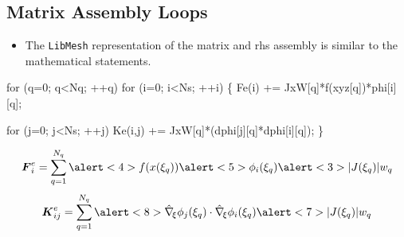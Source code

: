 \subsection*{Matrix Assembly Loops}
\begin{frame}[fragile,t]  
	\begin{block}{}
	  \begin{itemize}    
	  \item{ The \texttt{LibMesh} representation of the matrix and
	    rhs assembly is similar to the mathematical statements.
	  }
	  \end{itemize}
	\end{block}
\small
\begin{semiverbatim}
for (q=0; q<Nq; ++q) 
  for (i=0; i<Ns; ++i) \{
    \alert<2>{Fe(i)   += \alert<3>{JxW[q]}*\alert<4>{f(xyz[q])}*\alert<5>{phi[i][q]};}
    
    for (j=0; j<Ns; ++j)
      \alert<6>{Ke(i,j) += \alert<7>{JxW[q]}*(\alert<8>{dphi[j][q]*dphi[i][q]});}
  \}
\end{semiverbatim}
{
  \begin{equation}
    \nonumber
    \bv{F}^e_{i} = 
    \sum_{q=1}^{N_q}
    \alert<4>{f(x(\xi_q))}
    \alert<5>{\phi_i(\xi_q)}
    \alert<3>{|J(\xi_q)| w_q}
  \end{equation}
}
{
  \begin{equation}
  \nonumber
  \bv{K}^e_{ij} =
  \sum_{q=1}^{N_q}
  \alert<8>{
    \hat{\nabla}_{\!\xi} \phi_j(\xi_q) \cdot
    \hat{\nabla}_{\!\xi} \phi_i(\xi_q)
    }
  \alert<7>{|J(\xi_q)| w_q}
  \end{equation}
}
\end{frame}


\begin{frame}[allowframebreaks]
  
\end{frame}

